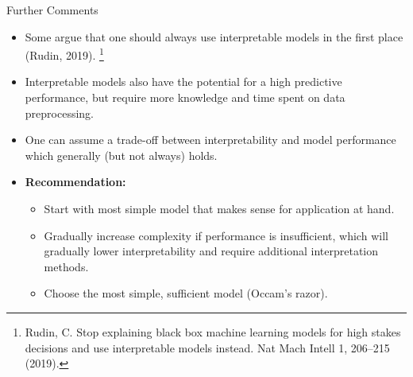 \documentclass[11pt,compress,t,notes=noshow, aspectratio=169, xcolor=table]{beamer}
\begin{document}
\begin{frame}{Further Comments}

    \begin{itemize}
    \itemsep1em
        \item Some argue that one should always use interpretable models in the first place (Rudin, 2019).
        \footnote[frame]{Rudin, C. Stop explaining black box machine learning models for high stakes decisions and use interpretable models instead. Nat Mach Intell 1, 206–215 (2019).}
        \item Interpretable models also have the potential for a high predictive performance, but require more knowledge and time spent on data preprocessing.
        \item One can assume a trade-off between interpretability and model performance which generally (but not always) holds.
        \item \textbf{Recommendation:}
        \begin{itemize}
            \item Start with most simple model that makes sense for application at hand.
            \item Gradually increase complexity if performance is insufficient, which will gradually lower interpretability and require additional interpretation methods.
            \item Choose the most simple, sufficient model (Occam's razor).
        \end{itemize} 
    \end{itemize}

\end{frame}
\end{document}
